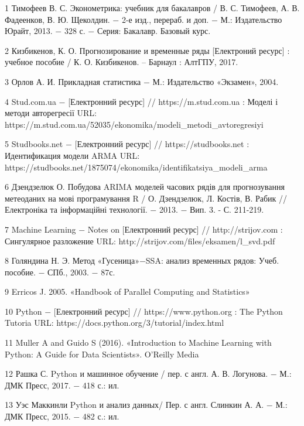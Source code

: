 
\hspace*{26pt} 1 Тимофеев В. С. Эконометрика: учебник для бакалавров / В. С. Тимофеев, А. В. Фадеенков, В. Ю. Щеколдин. $-$ 2-е изд., перераб. и доп. $-$ М.: Издательство Юрайт, 2013. $-$ 328 с. $-$ Серия: Бакалавр. Базовый курс.

2 Кизбикенов, К. О. Прогнозирование и временные ряды [Електроний ресурс] : учебное пособие / К. О. Кизбикенов. $–$ Барнаул : АлтГПУ, 2017.

3 Орлов А. И. Прикладная статистика $-$ М.: Издательство «Экзамен», 2004.

4 Stud.com.ua $-$ [Електронний ресурс] // https://m.stud.com.ua : Моделі і методи авторегресії URL: https://m.stud.com.ua/52035/ekonomika/modeli\_metodi\_avtoregresiyi

5 Studbooks.net $-$ [Електронний ресурс] // https://studbooks.net : Идентификация модели ARMA URL: https://studbooks.net/1875074/ekonomika/identifikatsiya\_modeli\_arma

6 Дзендзелюк О. Побудова ARIMA моделей часових рядів для прогнозування метеоданих на мові програмування R / О. Дзендзелюк, Л. Костів, В. Рабик // Електроніка та інформаційні технології. $-$ 2013. $-$ Вип. 3. - С. 211-219.

7 Machine Learning $-$ Notes on [Електронний ресурс] // http://strijov.com : Сингулярное разложение URL: \newline http://strijov.com/files/eksamen/l\_svd.pdf

8 Голяндина Н. Э. Метод «Гусеница»$-$SSA: анализ временных рядов: Учеб. пособие. $-$ СПб., 2003. $-$ 87с.

9 Erricos J. 2005. «Handbook of Parallel Computing and Statistics»

10 Python $-$ [Електронний ресурс] // https://www.python.org :  The Python Tutoria URL: https://docs.python.org/3/tutorial/index.html

11 Muller A and Guido S (2016). «Introduction to Machine Learning with Python: A Guide for Data Scientists». O'Reilly Media

12 Рашка С. Python и машинное обучение / пер. с англ. А. В. Логунова. $-$ М.: ДМК Пресс, 2017. $-$ 418 с.: ил.

13 Уэс Маккинли Python и анализ данных/ Пер. с англ. Слинкин А. А. $-$ М.: ДМК Пресс, 2015. $-$ 482 с.: ил. 

